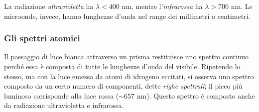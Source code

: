 \documentclass[11pt, a4paper]{scrartcl} %
\numberwithin{equation}{subsection}
\theoremstyle{style2}
\theoremstyle{style1}
\begin{document}
La radiazione \textit{ultravioletta} ha $\lambda < 400$ nm, mentre l'\textit{infrarossa} ha $\lambda > 700$ nm.
Le microonde, invece, hanno lunghezze d'onda nel range dei millimetri o centimetri.
\begin{table}[h!]
\centering
{}
\end{table}
\subsubsection{Gli spettri atomici}
Il passaggio di luce bianca attraverso un prisma restituisce uno spettro continuo perch\'e essa \`e composta di tutte le lunghezze d'onda del visibile.
Ripetendo lo stesso, ma con la luce emessa da atomi di idrogeno eccitati, si osserva uno spettro composto da un certo numero di componenti, dette \textit{righe spettrali}; il picco pi\`u luminoso corrisponde alla luce rossa ($\sim 657$ nm).
Questo spettro \`e composto anche da radiazione ultravioletta e infrarossa.
\end{document}
